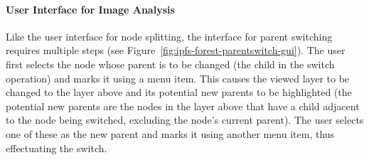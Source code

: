 \paragraph{User Interface for Image Analysis}

Like the user interface for node splitting, the interface for parent switching requires multiple steps (see Figure~\ref{fig:ipfs-forest-parentswitch-gui}). The user first selects the node whose parent is to be changed (the child in the switch operation) and marks it using a menu item. This causes the viewed layer to be changed to the layer above and its potential new parents to be highlighted (the potential new parents are the nodes in the layer above that have a child adjacent to the node being switched, excluding the node's current parent). The user selects one of these as the new parent and marks it using another menu item, thus effectuating the switch.

